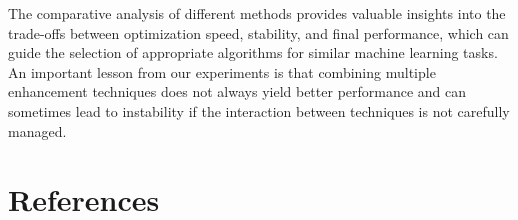 \documentclass{article}
\begin{document}
The comparative analysis of different methods provides valuable insights 
into the trade-offs between optimization speed, stability, and final performance, which can 
guide the selection of appropriate algorithms for similar machine learning tasks. 
An important lesson from our experiments is that combining multiple enhancement 
techniques does not always yield better performance and can sometimes lead to instability 
if the interaction between techniques is not carefully managed.

\pagebreak

\section*{References}
\printbibliography[heading=none]
\end{document}
